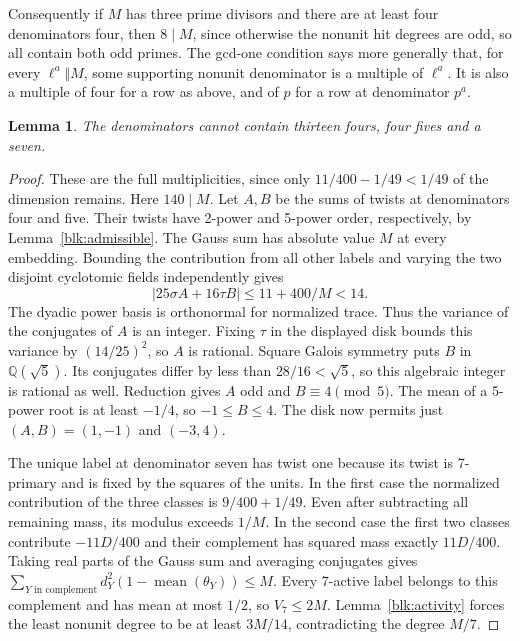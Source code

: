 \documentclass[11pt]{amsart}
\numberwithin{equation}{section}
\newtheorem{lemma}[theorem]{Lemma}
\begin{document}
Consequently if $M$ has three prime divisors and there are at least four denominators four, then $8\mid M$, since otherwise the nonunit hit degrees are odd, so all contain both odd primes. The gcd-one condition says more generally that, for every $\ell^a\Vert M$, some supporting nonunit denominator is a multiple of $\ell^a$. It is also a multiple of four for a row as above, and of $p$ for a row at denominator $p^a$.

\begin{lemma}\label{sq:mixed}
The denominators cannot contain thirteen fours, four fives and a seven.
\end{lemma}
\begin{proof}
These are the full multiplicities, since only
$11/400-1/49<1/49$ of the dimension remains. Here $140\mid M$.
Let $A,B$ be the sums of twists at denominators four and five.
Their twists have 2-power and 5-power order, respectively, by
Lemma~\ref{blk:admissible}. The Gauss sum has absolute value $M$
at every embedding. Bounding the contribution from all other labels
and varying the two disjoint cyclotomic fields independently gives
\[
             |25\sigma A+16\tau B|\le11+400/M<14 .
\]
The dyadic power basis is orthonormal for normalized trace. Thus
the variance of the conjugates of $A$ is an integer. Fixing $\tau$
in the displayed disk bounds this variance by $(14/25)^2$, so $A$
is rational. Square Galois symmetry puts $B$ in $\mathbb Q(\sqrt5)$.
Its conjugates differ by less than $28/16<\sqrt5$, so this
algebraic integer is rational as well. Reduction gives $A$ odd
and $B\equiv4\pmod5$. The mean of a 5-power root is at least
$-1/4$, so $-1\le B\le4$. The disk now permits just
$(A,B)=(1,-1)$ and $(-3,4)$.

The unique label at denominator seven has twist one because its twist is
7-primary and is fixed by the squares of the units. In the first
case the normalized contribution of the three classes is
$9/400+1/49$. Even after subtracting all remaining mass, its modulus
exceeds $1/M$. In the second case the first two classes contribute
$-11D/400$ and their complement has squared mass exactly $11D/400$.
Taking real parts of the Gauss sum and averaging conjugates gives
$\sum_{Y\text{ in complement}}d_Y^2
 (1-\operatorname{mean}(\theta_Y))\le M$.
Every 7-active label belongs to this complement and has mean at most
$1/2$, so $V_7\le2M$. Lemma~\ref{blk:activity} forces the least
nonunit degree to be at least $3M/14$, contradicting the degree $M/7$.
\end{proof}
\end{document}
